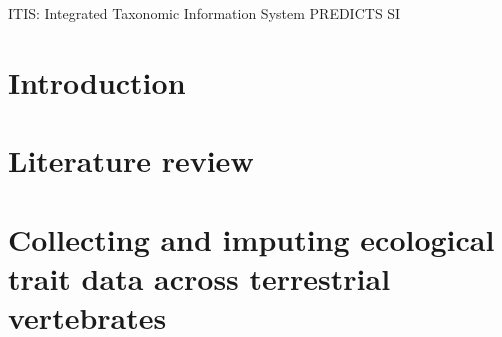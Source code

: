 \documentclass[11pt]{report}
\begin{document}






\clearpage
\tableofcontents


\clearpage
\listoftables

\clearpage
\listoffigures

ITIS: Integrated Taxonomic Information System
PREDICTS
SI

\clearpage

\chapter*{Introduction}


\chapter{Literature review}


\pagebreak
\chapter{Collecting and imputing ecological trait data across terrestrial vertebrates}
%


\end{document}
